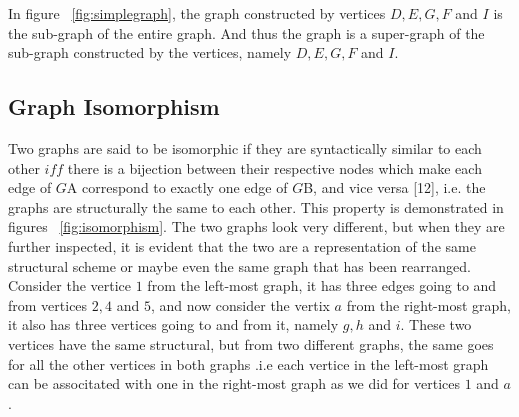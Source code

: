 In figure  ~\ref{fig:simplegraph}, the graph constructed by vertices $D,E,G,F$ and $I$ is the sub-graph of the entire graph. And thus the graph is a super-graph of the sub-graph constructed by the vertices, namely $D,E,G,F$ and $I$.

\subsection{Graph Isomorphism}
Two graphs are said to be isomorphic if they are syntactically similar to each other $iff$ there is a bijection between their respective nodes which make each edge of $G${\tiny A} correspond to exactly one edge of $G${\tiny B}, and vice versa [12], i.e. the graphs are structurally the same to each other. This property is demonstrated in figures ~\ref{fig:isomorphism}. 
\newpage
The two graphs look very different, but when they are further inspected, it is evident that the two are a representation of the same structural scheme or maybe even the same graph that has been rearranged. \newline\newline Consider the vertice $1$ from the left-most graph, it has three edges going to and from vertices $2,4$ and $5$, and now consider the vertix $a$ from the right-most graph, it also has three vertices going to and from it, namely $g,h$ and $i$. These two vertices have the same structural, but from two different graphs, the same goes for all the other vertices in both graphs .i.e each vertice in the left-most graph can be associtated with one in the right-most graph as we did for vertices $1$ and $a$.

